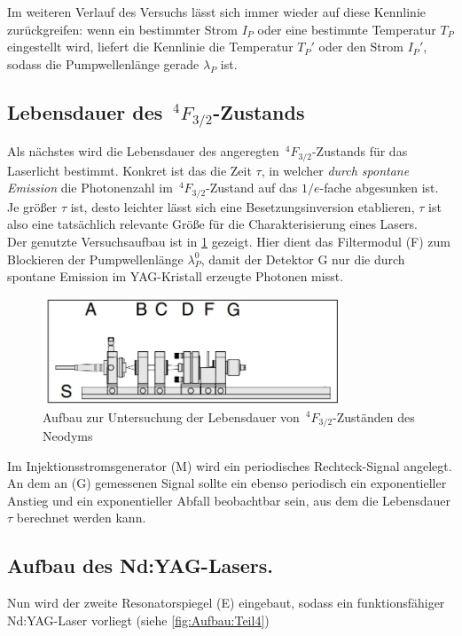 \documentclass[../main.tex]{subfiles}
\begin{document}
        Im weiteren Verlauf des Versuchs lässt sich immer wieder auf diese Kennlinie zurückgreifen: wenn ein bestimmter Strom $I_P$ oder eine bestimmte Temperatur $T_P$ eingestellt wird, liefert die Kennlinie die Temperatur $T_P'$ oder den Strom $I_P'$, sodass die Pumpwellenlänge gerade $\lambda_P$ ist.

    \subsection{Lebensdauer des $\,^4F_{3/2}$-Zustands}
        Als nächstes wird die Lebensdauer des angeregten $\,^4F_{3/2}$-Zustands für das Laserlicht bestimmt. Konkret ist das die Zeit $\tau$, in welcher \textit{durch spontane Emission} die Photonenzahl im $\,^4F_{3/2}$-Zustand auf das $1/e$-fache abgesunken ist. Je größer $\tau$ ist, desto leichter lässt sich eine Besetzungsinversion etablieren, $\tau$ ist also eine tatsächlich relevante Größe für die Charakterisierung eines Lasers.\\

        Der genutzte Versuchsaufbau ist in \ref{fig:Aufbau:Teil2} gezeigt. Hier dient das Filtermodul (F) zum Blockieren der Pumpwellenlänge $\lambda_P^{0}$, damit der Detektor G nur die durch spontane Emission im YAG-Kristall erzeugte Photonen misst.

        \begin{figure}[H]
            \centering
            \includegraphics[width=0.8\textwidth]{Bilddateien/Versuchsaufbau/Teil2.jpg}
            \caption{Aufbau zur Untersuchung der Lebensdauer von $\,^4F_{3/2}$-Zuständen des Neodyms}
            \label{fig:Aufbau:Teil2}
        \end{figure}    

        Im Injektionsstromsgenerator (M) wird ein periodisches Rechteck-Signal angelegt. An dem an (G) gemessenen Signal sollte ein ebenso periodisch ein exponentieller Anstieg und ein exponentieller Abfall beobachtbar sein, aus dem die Lebensdauer $\tau$ berechnet werden kann.  

    \subsection{Aufbau des Nd:YAG-Lasers.}\label{sec:Aufbau:NdYAGLaser}
        Nun wird der zweite Resonatorspiegel (E) eingebaut, sodass ein funktionsfähiger Nd:YAG-Laser vorliegt (siehe \ref{fig:Aufbau:Teil4})
\end{document}
